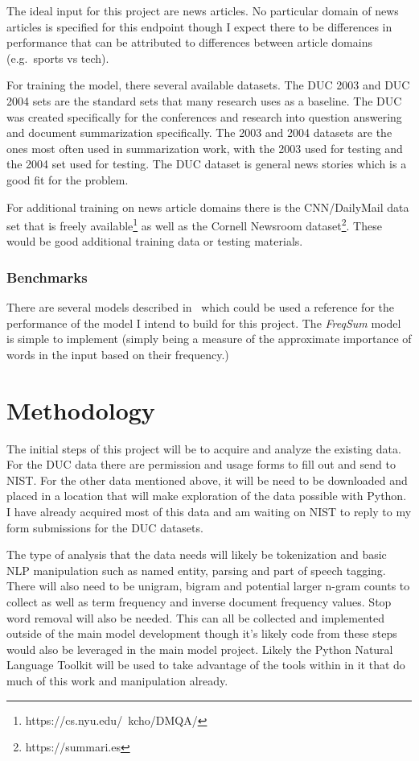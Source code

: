 \documentclass{article}
\begin{document}
The ideal input for this project are news articles. No particular domain of news
articles is specified for this endpoint though I expect there to be differences
in performance that can be attributed to differences between article domains
(e.g.\ sports vs tech).

For training the model, there several available datasets. The DUC 2003 and DUC
2004 sets are the standard sets that many research uses as a baseline. The DUC
was created specifically for the conferences and research into question
answering and document summarization specifically. The 2003 and 2004 datasets
are the ones most often used in summarization work, with the 2003 used for
testing and the 2004 set used for testing. The DUC dataset is general news
stories which is a good fit for the problem.

For additional training on news article domains there is the CNN/DailyMail data
set that is freely available\footnote{https://cs.nyu.edu/~kcho/DMQA/} as well as the
Cornell Newsroom dataset\footnote{https://summari.es}. These would be good additional
training data or testing materials.

\subsubsection{Benchmarks}
There are several models described in\ \cite{CPBL} which could be used a
reference for the performance of the model I intend to build for this project.
The \emph{FreqSum} model is simple to implement (simply being a measure of
the approximate importance of words in the input based on their frequency.)

\section{Methodology}

The initial steps of this project will be to acquire and analyze the existing
data. For the DUC data there are permission and usage forms to fill out and send
to NIST\@. For the other data mentioned above, it will be need to be downloaded
and placed in a location that will make exploration of the data possible with
Python. I have already acquired most of this data and am waiting on NIST to
reply to my form submissions for the DUC datasets.

The type of analysis that the data needs will likely be tokenization and basic
NLP manipulation such as named entity, parsing and part of speech tagging. There
will also need to be unigram, bigram and potential larger n-gram counts to
collect as well as term frequency and inverse document frequency values. Stop
word removal will also be needed. This can all be collected and implemented
outside of the main model development though it's likely code from these steps
would also be leveraged in the main model project. Likely the Python Natural
Language Toolkit will be used to take advantage of the tools within in it that
do much of this work and manipulation already.
\end{document}
